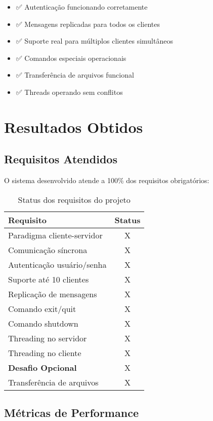 \documentclass[12pt,a4paper]{article}
\begin{document}
\begin{itemize}
    \item ✅ Autenticação funcionando corretamente
    \item ✅ Mensagens replicadas para todos os clientes
    \item ✅ Suporte real para múltiplos clientes simultâneos
    \item ✅ Comandos especiais operacionais
    \item ✅ Transferência de arquivos funcional
    \item ✅ Threads operando sem conflitos
\end{itemize}

\section{Resultados Obtidos}

\subsection{Requisitos Atendidos}

O sistema desenvolvido atende a 100\% dos requisitos obrigatórios:

\begin{table}[H]
\centering
\begin{tabular}{|l|c|}
\hline
\textbf{Requisito} & \textbf{Status} \\
\hline
Paradigma cliente-servidor & X \\
Comunicação síncrona & X \\
Autenticação usuário/senha & X \\
Suporte até 10 clientes & X \\
Replicação de mensagens & X \\
Comando exit/quit & X \\
Comando shutdown & X \\
Threading no servidor & X \\
Threading no cliente & X \\
\hline
\textbf{Desafio Opcional} & X \\
\hline
Transferência de arquivos & X \\
\hline
\end{tabular}
\caption{Status dos requisitos do projeto}
\end{table}

\subsection{Métricas de Performance}
\end{document}
